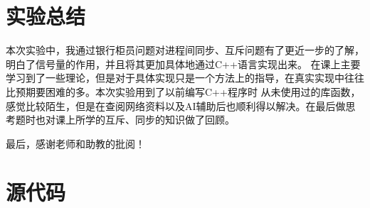 \documentclass[UTF8]{ctexart}
\begin{document}
\section{实验总结}

本次实验中，我通过银行柜员问题对进程间同步、互斥问题有了更近一步的了解，明白了信号量的作用，并且将其更加具体地通过C++语言实现出来。
在课上主要学习到了一些理论，但是对于具体实现只是一个方法上的指导，在真实实现中往往比预期要困难的多。本次实验用到了以前编写C++程序时
从未使用过的库函数，感觉比较陌生，但是在查阅网络资料以及AI辅助后也顺利得以解决。在最后做思考题时也对课上所学的互斥、同步的知识做了回顾。

最后，感谢老师和助教的批阅！

\newpage
\section{源代码}
\end{document}
